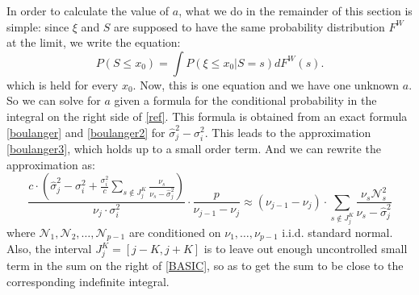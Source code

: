 \documentclass[12pt]{amsart}
\theoremstyle{definition}
\numberwithin{equation}{section}
\numberwithin{equation}{section}
\theoremstyle{remark}
\numberwithin{equation}{section}
\begin{document}
In order to calculate the value of $a$, what we do in the remainder of this section
is simple: since $\xi$ and $S$ are supposed to have the same probability distribution $F^W$ at the limit,
we write the equation:
\begin{equation}
\label{ref}
P(S\leq x_0)=\int P(\xi\leq x_0|S=s)dF^W(s).
\end{equation}
which is held for every $x_0$. Now, this is one equation and we have one unknown $a$. So we can solve for $a$ given a formula for the conditional probability in the integral on the right side of \ref{ref}. This formula is obtained from an exact formula \ref{boulanger} and \ref{boulanger2} for $\hat{\sigma}^2_j-\sigma^2_i$.  This leads to the approximation \ref{boulanger3}, which holds up to a small order term. And we can rewrite the approximation as:
\begin{equation}
\label{BASIC}
\frac{c\cdot(\hat{\sigma}^2_j-\sigma^2_i+\frac{\sigma^2_i}{c}
\sum_{s\notin J^K_j} \frac{\nu_s}{\nu_s-\hat{\sigma}^2_j})}{\nu_j\cdot \sigma^2_i}\cdot \frac{p}{\nu_{j-1}-\nu_j}\approx
(\nu_{j-1}-\nu_j)\cdot
\sum_{s\notin J^K_j} \frac{\nu_s\mathcal{N}^2_{s}}{\nu_s-\hat{\sigma}^2_j}
\end{equation}
where $\mathcal{N}_1,\mathcal{N}_2,\ldots,\mathcal{N}_{p-1}$ are conditioned
on $\nu_1,\ldots,\nu_{p-1}$ i.i.d. standard normal. Also, the interval $J^K_j=[j-K,j+K]$ is to leave out enough uncontrolled small term in the sum on the right
of \ref{BASIC}, so as to get the sum to be close to the corresponding indefinite integral.
\end{document}
